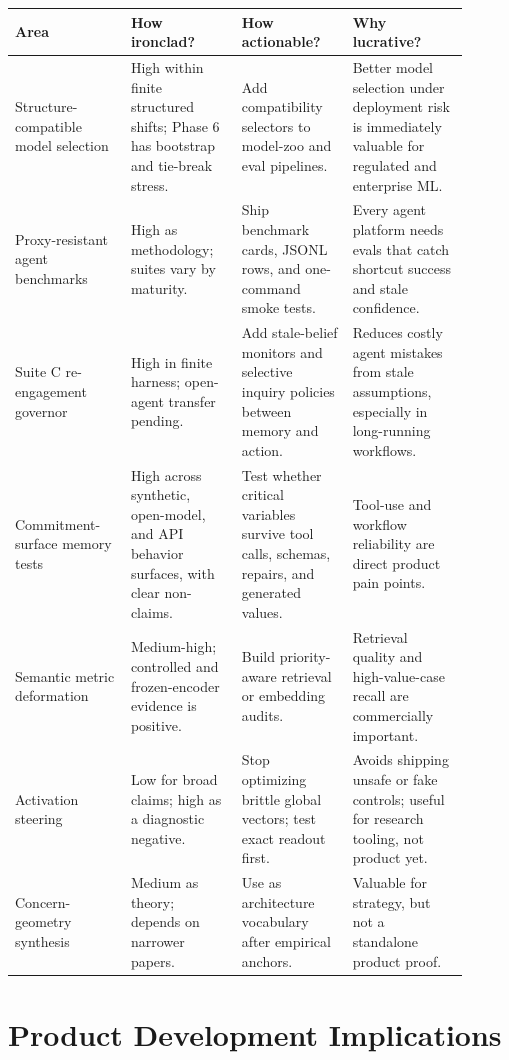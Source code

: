 \documentclass[11pt]{article}
\begin{document}
\begin{longtable}{L{0.23\linewidth}L{0.22\linewidth}L{0.22\linewidth}L{0.23\linewidth}}
\toprule
\textbf{Area} & \textbf{How ironclad?} & \textbf{How actionable?} & \textbf{Why lucrative?} \\
\midrule
\endhead
Structure-compatible model selection & High within finite structured shifts;
Phase 6 has bootstrap and tie-break stress. & Add compatibility selectors to
model-zoo and eval pipelines. & Better model selection under deployment risk
is immediately valuable for regulated and enterprise ML. \\
\addlinespace
Proxy-resistant agent benchmarks & High as methodology; suites vary by
maturity. & Ship benchmark cards, JSONL rows, and one-command smoke tests. &
Every agent platform needs evals that catch shortcut success and stale
confidence. \\
\addlinespace
Suite C re-engagement governor & High in finite harness; open-agent transfer
pending. & Add stale-belief monitors and selective inquiry policies between
memory and action. & Reduces costly agent mistakes from stale assumptions,
especially in long-running workflows. \\
\addlinespace
Commitment-surface memory tests & High across synthetic, open-model, and API
behavior surfaces, with clear non-claims. & Test whether critical variables
survive tool calls, schemas, repairs, and generated values. & Tool-use and
workflow reliability are direct product pain points. \\
\addlinespace
Semantic metric deformation & Medium-high; controlled and frozen-encoder
evidence is positive. & Build priority-aware retrieval or embedding audits. &
Retrieval quality and high-value-case recall are commercially important. \\
\addlinespace
Activation steering & Low for broad claims; high as a diagnostic negative. &
Stop optimizing brittle global vectors; test exact readout first. & Avoids
shipping unsafe or fake controls; useful for research tooling, not product yet. \\
\addlinespace
Concern-geometry synthesis & Medium as theory; depends on narrower papers. &
Use as architecture vocabulary after empirical anchors. & Valuable for
strategy, but not a standalone product proof. \\
\bottomrule
\end{longtable}

\section{Product Development Implications}
\end{document}
